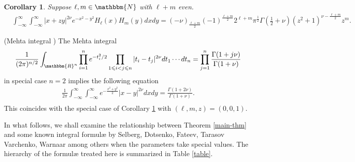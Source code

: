 \documentclass{article}
\numberwithin{equation}{section}
\newtheorem{corollary}{Corollary}[section]
{\theorembodyfont{\rmfamily}\newtheorem{example}[corollary]{Example}}
\begin{document}
\begin{corollary}
  \label{cor:Hermite}Suppose $\ell, m \in \mathbbm{N}$ with $\ell + m$
  even.
  \begin{eqnarray}
    & \displaystyle\int_{- \infty}^{\infty} \displaystyle\int_{- \infty}^{\infty} | x + z y |^{2 \nu}
    e^{- x^2 - y^2} H_{\ell} (x) H_m (y) d x d y = (- \nu)_{\frac{\ell +
    m}{2}} (- 1)^{\frac{\ell + m}{2}} 2^{\ell + m} \pi^{\frac{1}{2}} \Gamma
    \left( \frac{1}{2} + \nu \right) (z^2 + 1)^{\nu - \frac{\ell + m}{2}} z^m
    . &  \nonumber
  \end{eqnarray}
\end{corollary}

\begin{example}
  (Mehta integral {\cite{mehta2004random}}) The Mehta integral
  \begin{equation*}
     \frac{1}{(2 \pi)^{n / 2}} \displaystyle\int_{\mathbbm{R}^n} \prod_{i = 1}^n e^{-
    t_i^2 / 2}_{} \prod_{1 \leqslant i < j \leqslant n} | t_i - t_j |^{2 \nu}
    d t_1 \cdots d t_n
     = \prod_{j = 1}^n \frac{\Gamma (1 + j \nu)}{\Gamma (1 + \nu)}
  \end{equation*}
  in special case $n = 2$ implies the following equation
  \begin{eqnarray}
    & \frac{1}{2 \pi} \displaystyle\int_{- \infty}^{\infty} \displaystyle\int_{- \infty}^{\infty} e^{-
    \frac{x^2 + y^2}{2}} | x - y |^{2 \nu} d x d y = \frac{\Gamma (1 + 2
    \nu)}{\Gamma (1 + \nu)} . &  \nonumber\\
    &  &  \nonumber
  \end{eqnarray}
  This coincides with the special case of Corollary \ref{cor:Hermite} with
  $(\ell, m, z) = (0, 0, 1)$.
\end{example}

In what follows, we shall examine the relationship between Theorem
\ref{main-thm} and some known integral formul{\ae} by Selberg, Dotsenko,
Fateev, Tarasov Varchenko, Warnaar among others when the parameters take
special values. The hierarchy of the formul{\ae} treated here is summarized in
Table \ref{table}.
\end{document}
